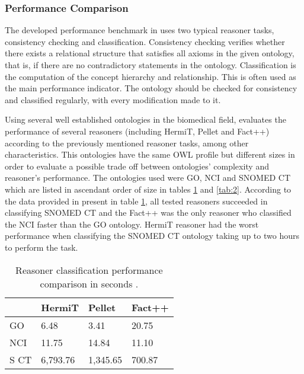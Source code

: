 \subsubsection{Performance Comparison}

The developed performance benchmark in \cite{Dentler2011} uses two typical reasoner tasks, consistency checking and classification. Consistency checking verifies whether there exists a relational structure that satisfies all axioms in the given ontology, that is, if there are no contradictory statements in the ontology. Classification is the computation of the concept hierarchy and relationship. This is often used as the main performance indicator. The ontology should be checked for consistency and classified regularly, with every modification made to it. 

Using several well established ontologies in the biomedical field, \cite{Dentler2011} evaluates the performance of several reasoners (including HermiT, Pellet and Fact++) according to the previously mentioned reasoner tasks, among other characteristics. This ontologies have the same OWL profile but different sizes in order to evaluate a possible trade off between ontologies' complexity and reasoner's performance. The ontologies used were GO, NCI and SNOMED CT which are listed in ascendant order of size in tables \ref{tab:1} and \ref{tab:2}. According to the data provided in \cite{Dentler2011} present in table \ref{tab:1}, all tested reasoners succeeded in classifying SNOMED CT and the Fact++ was the only reasoner who classified the NCI faster than the GO ontology. HermiT reasoner had the worst performance when classifying the SNOMED CT ontology taking up to two hours to perform the task.



\begin{table}[]
\centering
\caption{Reasoner classification performance comparison in seconds \cite{Dentler2011}.}
\begin{tabular}{|l|l|l|l|}
\hline
      &  HermiT    &  Pellet     &  Fact++    \\ \hline
GO    &    6.48    &  3.41       &  20.75     \\ \hline
NCI   &   11.75    &  14.84      &  11.10     \\ \hline
S CT  &  6,793.76  &  1,345.65   &  700.87    \\ \hline
\end{tabular}
\label{tab:1}
\end{table}

